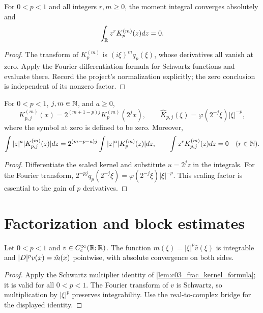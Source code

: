\begin{lemma}
  \label{lem:c12_kernel_moments}
  For $0<p<1$ and all integers $r,m\ge0$, the moment integral converges absolutely and
  \[
    \int_\R z^r K_p^{(m)}(z)dz=0.
  \]
\end{lemma}
\begin{proof}
  The transform of $K_p^{(m)}$ is $(i\xi)^mq_p(\xi)$, whose derivatives all vanish at zero.
  Apply the Fourier differentiation formula for Schwartz functions and evaluate there.
  Record the project's normalization explicitly; the zero conclusion is independent of its nonzero factor.
\end{proof}

\begin{lemma}
  \label{lem:c12_kernel_scaling}
  For $0<p<1$, $j,m\in\N$, and $a\ge0$,
  \[
    K_{p,j}^{(m)}(x)=2^{(m+1-p)j}K_p^{(m)}(2^jx),\qquad
    \widehat K_{p,j}(\xi)=\varphi(2^{-j}\xi)|\xi|^{-p},
  \]
  where the symbol at zero is defined to be zero. Moreover,
  \[
    \int|z|^a|K_{p,j}^{(m)}(z)|dz
      =2^{(m-p-a)j}\int|z|^a|K_p^{(m)}(z)|dz,
    \qquad \int z^rK_{p,j}^{(m)}(z)dz=0\quad(r\in\N).
  \]
\end{lemma}
\begin{proof}
  Differentiate the scaled kernel and substitute $u=2^jz$ in the integrals.
  For the Fourier transform, $2^{-pj}q_p(2^{-j}\xi)=\varphi(2^{-j}\xi)|\xi|^{-p}$.
  This scaling factor is essential to the gain of $p$ derivatives.
\end{proof}

\section{Factorization and block estimates}

\begin{lemma}
  \label{lem:c12_compact_fourier_bridge}
  Let $0<p<1$ and $v\in C_c^\infty(\R;\R)$.
  The function $m(\xi)=|\xi|^p\widehat v(\xi)$ is integrable and
  $|D|^pv(x)=\widecheck m(x)$ pointwise, with absolute convergence on both sides.
\end{lemma}
\begin{proof}
  Apply the Schwartz multiplier identity of \cref{lem:c03_frac_kernel_formula}; it is valid for
  all $0<p<1$. The Fourier transform of $v$ is Schwartz, so multiplication by $|\xi|^p$
  preserves integrability. Use the real-to-complex bridge for the displayed identity.
\end{proof}

